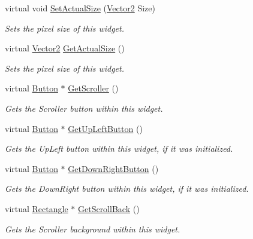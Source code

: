 \begin{DoxyCompactItemize}
virtual void \hyperlink{classphys_1_1UI_1_1Scrollbar_a0c543abcd12e168d6084471bd0e0420e}{SetActualSize} (\hyperlink{classphys_1_1Vector2}{Vector2} Size)
\begin{DoxyCompactList}\small\item\em Sets the pixel size of this widget. \item\end{DoxyCompactList}\item 
virtual \hyperlink{classphys_1_1Vector2}{Vector2} \hyperlink{classphys_1_1UI_1_1Scrollbar_a2b3d791cbbe4c787f284d8b12a0edf27}{GetActualSize} ()
\begin{DoxyCompactList}\small\item\em Sets the pixel size of this widget. \item\end{DoxyCompactList}\item 
virtual \hyperlink{classphys_1_1UI_1_1Button}{Button} $\ast$ \hyperlink{classphys_1_1UI_1_1Scrollbar_a28024d2f3a017e4ed3c2a4df62a1e8be}{GetScroller} ()
\begin{DoxyCompactList}\small\item\em Gets the Scroller button within this widget. \item\end{DoxyCompactList}\item 
virtual \hyperlink{classphys_1_1UI_1_1Button}{Button} $\ast$ \hyperlink{classphys_1_1UI_1_1Scrollbar_ab298f9747da2eed451ddce8b1a416c15}{GetUpLeftButton} ()
\begin{DoxyCompactList}\small\item\em Gets the UpLeft button within this widget, if it was initialized. \item\end{DoxyCompactList}\item 
virtual \hyperlink{classphys_1_1UI_1_1Button}{Button} $\ast$ \hyperlink{classphys_1_1UI_1_1Scrollbar_abf733d00087050d575fca1abc2d4ba0e}{GetDownRightButton} ()
\begin{DoxyCompactList}\small\item\em Gets the DownRight button within this widget, if it was initialized. \item\end{DoxyCompactList}\item 
virtual \hyperlink{classphys_1_1UI_1_1Rectangle}{Rectangle} $\ast$ \hyperlink{classphys_1_1UI_1_1Scrollbar_a1c24fbb88f9d86aff1b2f0abc033116a}{GetScrollBack} ()
\begin{DoxyCompactList}\small\item\em Gets the Scroller background within this widget. \item\end{DoxyCompactList}\end{DoxyCompactItemize}
